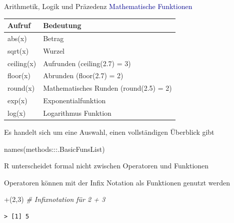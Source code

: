 \documentclass[
  8pt,
  ignorenonframetext,
]{beamer}
\newenvironment{Shaded}{\begin{snugshade}}{\end{snugshade}}
\newcommand{\AttributeTok}[1]{\textcolor[rgb]{0.77,0.63,0.00}{#1}}
\newcommand{\CommentTok}[1]{\textcolor[rgb]{0.56,0.35,0.01}{\textit{#1}}}
\newcommand{\DecValTok}[1]{\textcolor[rgb]{0.00,0.00,0.81}{#1}}
\newcommand{\FunctionTok}[1]{\textcolor[rgb]{0.00,0.00,0.00}{#1}}
\newcommand{\NormalTok}[1]{#1}
\newcommand{\SpecialCharTok}[1]{\textcolor[rgb]{0.00,0.00,0.00}{#1}}
\newcommand{\StringTok}[1]{\textcolor[rgb]{0.31,0.60,0.02}{#1}}
\begin{document}
\begin{frame}[fragile]{Arithmetik, Logik und Präzedenz}
\protect\hypertarget{arithmetik-logik-und-pruxe4zedenz-3}{}
\textcolor{darkblue}{Mathematische Funktionen} 

\small
\begin{center}
\begin{tabular}{l|l}
Aufruf              & Bedeutung                                 \\\hline
abs(x)              & Betrag                                    \\
sqrt(x)             & Wurzel                                    \\
ceiling(x)          & Aufrunden (ceiling(2.7) = 3)              \\
floor(x)            & Abrunden (floor(2.7) = 2)                 \\
round(x)            & Mathematisches Runden (round(2.5) = 2)    \\
exp(x)              & Exponentialfunktion                       \\
log(x)              & Logarithmus Funktion                      \\
\end{tabular}
\end{center}

Es handelt sich um eine Auswahl, einen vollständigen Überblick gibt

\begin{Shaded}
\begin{Highlighting}[]
\FunctionTok{names}\NormalTok{(methods}\SpecialCharTok{:::}\NormalTok{.BasicFunsList)}
\end{Highlighting}
\end{Shaded}

R unterscheidet formal nicht zwischen Operatoren und Funktionen

Operatoren können mit der Infix Notation als Funktionen genutzt werden

\begin{Shaded}
\begin{Highlighting}[]
\StringTok{\textasciigrave{}}\AttributeTok{+}\StringTok{\textasciigrave{}}\NormalTok{(}\DecValTok{2}\NormalTok{,}\DecValTok{3}\NormalTok{)            }\CommentTok{\# Infixnotation für 2 + 3}
\end{Highlighting}
\end{Shaded}

\begin{verbatim}
> [1] 5
\end{verbatim}
\end{frame}
\end{document}
